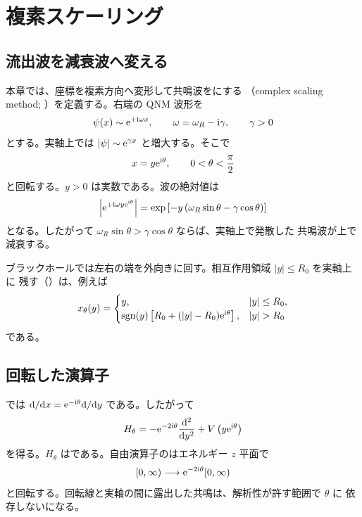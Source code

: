 \chapter{複素スケーリング}
\label{chap:complex-scaling}

\section{流出波を減衰波へ変える}

本章では、座標を複素方向へ変形して共鳴波をにする
（complex scaling method; ）を定義する。右端の
QNM 波形を
\begin{equation}
\psi(x)
\sim
\mathrm{e}^{+\mathrm{i}\omega x},
\qquad
\omega=\omega_R-\mathrm{i}\gamma,
\qquad
\gamma>0
\end{equation}
とする。実軸上では $|\psi|\sim\mathrm{e}^{\gamma x}$ と増大する。そこで
\begin{equation}
x
=
y\mathrm{e}^{\mathrm{i}\theta},
\qquad
0<\theta<\frac{\pi}{2}
\label{eq:uniform-complex-scaling}
\end{equation}
と回転する。$y>0$ は実数である。波の絶対値は
\begin{equation}
\left|
\mathrm{e}^{+\mathrm{i}\omega y\mathrm{e}^{\mathrm{i}\theta}}
\right|
=
\exp\left[
-y\left(
\omega_R\sin\theta-\gamma\cos\theta
\right)
\right]
\label{eq:complex-scaling-decay}
\end{equation}
となる。したがって $\omega_R\sin\theta>\gamma\cos\theta$ ならば、実軸上で発散した
共鳴波が上で減衰する。

ブラックホールでは左右の端を外向きに回す。相互作用領域 $|y|\leq R_0$ を実軸上に
残す（）は、例えば
\begin{equation}
x_\theta(y)
=
\begin{cases}
y,
& |y|\leq R_0,
\\
\sgn(y)
\left[
R_0+(|y|-R_0)\rme^{\rmi\theta}
\right],
& |y|>R_0
\end{cases}
\label{eq:exterior-complex-scaling}
\end{equation}
である。

\section{回転した演算子}

では $\mathrm{d}/\mathrm{d} x=\mathrm{e}^{-\mathrm{i}\theta}\mathrm{d}/\mathrm{d} y$ である。したがって
\begin{equation}
H_\theta
=
-\mathrm{e}^{-2\mathrm{i}\theta}
\frac{\mathrm{d}^2}{\mathrm{d} y^2}
+V\left(y\mathrm{e}^{\mathrm{i}\theta}\right)
\label{eq:complex-scaled-hamiltonian}
\end{equation}
を得る。$H_\theta$ はである。自由演算子のはエネルギー
$z$ 平面で
\begin{equation}
[0,\infty)
\longrightarrow
\mathrm{e}^{-2\mathrm{i}\theta}[0,\infty)
\label{eq:rotated-continuum}
\end{equation}
と回転する。回転線と実軸の間に露出した共鳴は、解析性が許す範囲で $\theta$ に
依存しないになる。

